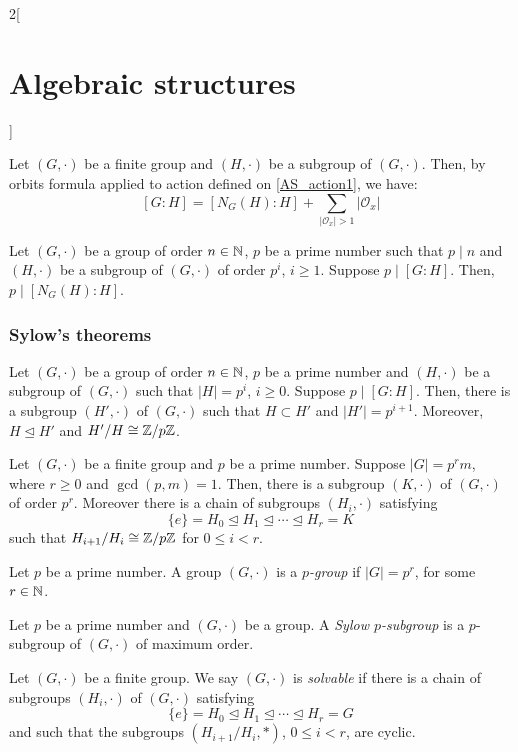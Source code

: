 \documentclass[../../../main_math.tex]{subfiles}
\begin{document}
\begin{multicols}{2}[\section{Algebraic structures}]
\begin{lemma}
  \end{lemma}
  \begin{corollary}
    Let $(G,\cdot)$ be a finite group and $(H,\cdot)$ be a subgroup of $(G,\cdot)$. Then, by orbits formula applied to action defined on \cref{AS_action1}, we have: $$[G:H]=[N_G(H):H]+\sum_{|\mathcal{O}_x|>1}|\mathcal{O}_x|$$
  \end{corollary}
  \begin{proposition}
    Let $(G,\cdot)$ be a group of order $n\in\mathbb{N} $, $p$ be a prime number such that $p\mid n$ and $(H,\cdot)$ be a subgroup of $(G,\cdot)$ of order $p^i$, $i\geq 1$. Suppose $p\mid[G:H]$. Then, $p\mid[N_G(H):H]$.
  \end{proposition}
  \subsubsection{Sylow's theorems}
  \begin{corollary}
    Let $(G,\cdot)$ be a group of order $n\in\mathbb{N} $, $p$ be a prime number and $(H,\cdot)$ be a subgroup of $(G,\cdot)$ such that $|H|=p^i$, $i\geq 0$. Suppose $p\mid[G:H]$. Then, there is a subgroup $(H',\cdot)$ of $(G,\cdot)$ such that $H\subset H'$ and $|H'|=p^{i+1}$. Moreover, $H\unlhd H'$ and $H'/H\cong\mathbb{Z} /p\mathbb{Z} $.
  \end{corollary}
  \begin{theorem}
    Let $(G,\cdot)$ be a finite group and $p$ be a prime number. Suppose $|G|=p^r m$, where $r\geq 0$ and $\gcd(p,m)=1$. Then, there is a subgroup $(K,\cdot)$ of $(G,\cdot)$ of order $p^r$. Moreover there is a chain of subgroups $(H_i,\cdot)$ satisfying $$\{e\}=H_0\unlhd H_1\unlhd\cdots\unlhd H_r=K$$ such that $H_{i+1}/H_i\cong\mathbb{Z} /p\mathbb{Z} $ for $0\leq i<r$.
  \end{theorem}
  \begin{definition}
    Let $p$ be a prime number. A group $(G,\cdot)$ is a \emph{$p$-group} if $|G|=p^r$, for some $r\in\mathbb{N} $.
  \end{definition}
  \begin{definition}
    Let $p$ be a prime number and $(G,\cdot)$ be a group. A \emph{Sylow $p$-subgroup} is a $p$-subgroup of $(G,\cdot)$ of maximum order.
  \end{definition}
  \begin{definition}
    Let $(G,\cdot)$ be a finite group. We say $(G,\cdot)$ is \emph{solvable} if there is a chain of subgroups $(H_i,\cdot)$ of $(G,\cdot)$ satisfying $$\{e\}=H_0\unlhd H_1\unlhd\cdots\unlhd H_r=G$$ and such that the subgroups $(H_{i+1}/H_i,*)$, $0\leq i<r$, are cyclic.

\end{definition}
\end{multicols}
\end{document}
